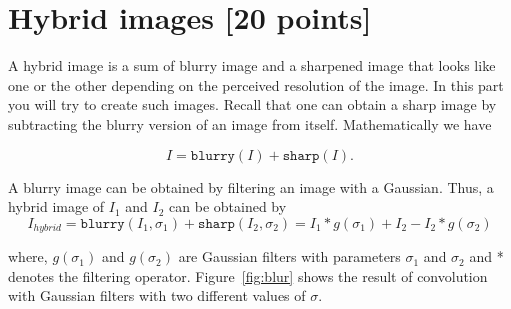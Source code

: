 \documentclass[10pt,letterpaper]{article}
\begin{document}
\section{Hybrid images [20 points]}
A hybrid image is a sum of blurry image and a sharpened image that looks like one or
the other depending on the perceived resolution of the image. In this part you will try to create such images.
Recall that one can obtain a sharp image by subtracting the blurry
version of an image from itself. Mathematically we have

\[
	I = \texttt{blurry}(I) + \texttt{sharp}(I).
\]

A blurry image can be obtained by filtering an image with
a Gaussian. Thus, a hybrid image of $I_1$ and $I_2$ can be obtained by
\begin{equation}\label{eq:hybrid}
	I_{hybrid} = \texttt{blurry}(I_1, \sigma_1) + \texttt{sharp}(I_2, \sigma_2) = I_1 * g(\sigma_1) + I_2 - I_2*g(\sigma_2)
\end{equation}

where, $g(\sigma_1)$ and $g(\sigma_2)$ are Gaussian filters with
parameters $\sigma_1$ and $\sigma_2$ and * denotes the filtering
operator.
Figure~\ref{fig:blur} shows the result of convolution with Gaussian filters with two different values of $\sigma$. 
\end{document}
